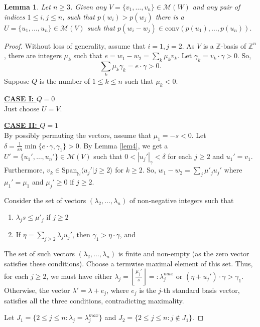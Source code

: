 \documentclass[10pt,a4paper]{amsart}
\newtheorem{lem}{Lemma}
\newcommand{\N}{\mathbb{N}}
\newcommand{\Z}{\mathbb{Z}}
\newcommand{\cM}{\mathcal{M}}
\newcommand{\cv}{\mathrm{conv}}
\begin{document}
\begin{lem}
    \label{lem6}
    Let $n\geq 3$. Given any $V = \{v_1,\ldots,v_n\} \in \cM(W)$ and any pair of indices $1\leq i,j\leq n$, such that $p(w_i)>p(w_j)$ there is a $U=\{u_1,\ldots,u_n\} \in \cM(V)$ such that $p(w_i-w_j) \in \cv(p(u_1),\ldots,p(u_n)).$
\end{lem}

\begin{proof}
    Without loss of generality, assume that $i=1, j=2$. As $V$ is a $\Z$-basis of $\Z^n$, there are integers $\mu_k$ such that $e =w_1-w_2 = \sum_k \mu_k v_k$. Let $\gamma_k=v_k\cdot \gamma >0$. So, 
    $$\sum_k \mu_k \gamma_k = e\cdot \gamma>0.$$
    Suppose $Q$ is the number of $1\leq k\leq n$ such that $\mu_k<0$.

\underline{\textbf{CASE I: $Q=0$}} \\
Just choose $U=V$.

\underline{\textbf{CASE II: $Q=1$}} \\
By possibly permuting the vectors, assume that $\mu_1 = -s<0$. Let $\delta = \frac{1}{sn}\min\{e\cdot \gamma, \gamma_1 \}>0$. By Lemma \ref{lem4}, we get a $U'=\{u_1',\ldots,u_n'\}\in \cM(V)$ such that $0<|u_j'|_\gamma<\delta$ for each $j\geq  2$ and $u_1'=v_1$. Furthermore, $v_k \in \mathrm{Span}_\N\langle u_j'|j\geq 2\rangle$ for $k\geq 2$. So, $w_1-w_2 =\sum_j \mu'_j
u_j'$ where $\mu_1'=\mu_1$ and $\mu_j'\geq 0$ if $j\geq 2$.

Consider the set of vectors $(\lambda_2,\ldots, \lambda_n)$ of non-negative integers such that 
\begin{enumerate}
    \item $\lambda_js \leq \mu'_j$ if $j\geq 2$
    \item If $\eta = \sum_{j\geq 2} \lambda_j u_j'$, then $\gamma_1>\eta\cdot \gamma$, and
\end{enumerate}

The set of such vectors $(\lambda_2, \ldots, \lambda_n)$ is finite and non-empty (as the zero vector satisfies these conditions). Choose a termwise maximal element of this set. Thus, for each $j\geq 2$, we must have either $\lambda_j = \left\lfloor\frac{\mu_j'}{s}\right\rfloor =:\lambda_j^{max}$ or $(\eta+u_j')\cdot \gamma > \gamma_1$. Otherwise, the vector $\lambda' = \lambda+e_{j}$, where $e_j$ is the $j$-th standard basis vector, satisfies all the three conditions, contradicting maximality.

Let $J_1 = \{2\leq j \leq n : \lambda_j=\lambda_j^{max}\}$ and $J_2 = \{2\leq j \leq n : j\notin J_1\}$.


\end{proof}
\end{document}
